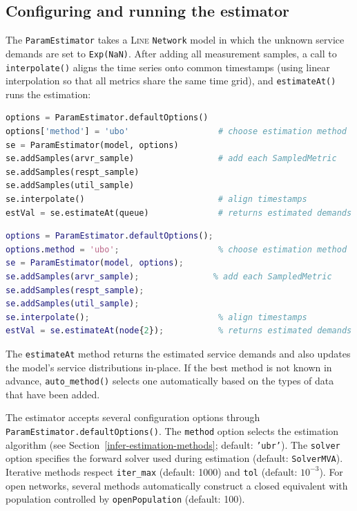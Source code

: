 \subsection{Configuring and running the estimator}
\label{sec:infer-param-estimator}

The \texttt{ParamEstimator} takes a \textsc{Line} \texttt{Network} model in which the unknown service demands are set to \texttt{Exp(NaN)}. After adding all measurement samples, a call to \texttt{interpolate()} aligns the time series onto common timestamps (using linear interpolation so that all metrics share the same time grid), and \texttt{estimateAt()} runs the estimation:
\begin{PYTHON}
\begin{lstlisting}[language=python]
options = ParamEstimator.defaultOptions()
options['method'] = 'ubo'                  # choose estimation method
se = ParamEstimator(model, options)
se.addSamples(arvr_sample)                 # add each SampledMetric
se.addSamples(respt_sample)
se.addSamples(util_sample)
se.interpolate()                           # align timestamps
estVal = se.estimateAt(queue)              # returns estimated demands
\end{lstlisting}
\end{PYTHON}
\begin{MATLAB}
\begin{lstlisting}[language=matlab]
options = ParamEstimator.defaultOptions();
options.method = 'ubo';                    % choose estimation method
se = ParamEstimator(model, options);
se.addSamples(arvr_sample);               % add each SampledMetric
se.addSamples(respt_sample);
se.addSamples(util_sample);
se.interpolate();                          % align timestamps
estVal = se.estimateAt(node{2});           % returns estimated demands
\end{lstlisting}
\end{MATLAB}

\noindent The \texttt{estimateAt} method returns the estimated service demands and also updates the model's service distributions in-place. If the best method is not known in advance, \texttt{auto\_method()} selects one automatically based on the types of data that have been added.

\label{sec:infer-options}
The estimator accepts several configuration options through \texttt{ParamEstimator.defaultOptions()}. The \texttt{method} option selects the estimation algorithm (see Section~\ref{infer-estimation-methods}; default: \texttt{'ubr'}). The \texttt{solver} option specifies the forward solver used during estimation (default: \texttt{SolverMVA}). Iterative methods respect \texttt{iter\_max} (default: 1000) and \texttt{tol} (default: $10^{-3}$). For open networks, several methods automatically construct a closed equivalent with population controlled by \texttt{openPopulation} (default: 100).


